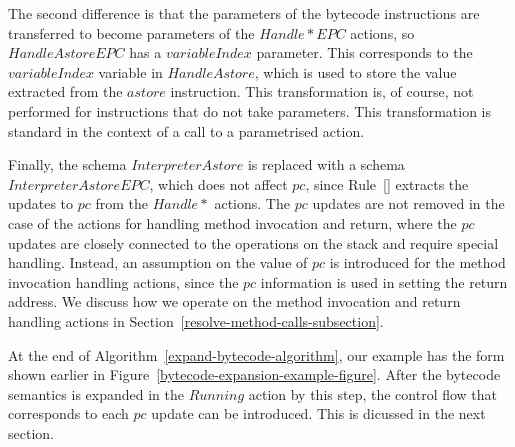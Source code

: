 The second difference is that the parameters of the bytecode
instructions are transferred to become parameters of the
$Handle{*}EPC$ actions, so $HandleAstoreEPC$ has a $variableIndex$
parameter.
This corresponds to the $variableIndex$ variable in $HandleAstore$,
which is used to store the value extracted from the $astore$
instruction.
This transformation is, of course, not performed for instructions that
do not take parameters.
This transformation is standard in the context of a call to a
parametrised action.

Finally, the schema $InterpreterAstore$ is replaced with a schema
$InterpreterAstoreEPC$, which does not affect $pc$, since
Rule~[] extracts the
updates to $pc$ from the $Handle{*}$ actions.
The $pc$ updates are not removed in the case of the actions for
handling method invocation and return, where the $pc$ updates are
closely connected to the operations on the stack and require special
handling.
Instead, an assumption on the value of $pc$ is introduced for the
method invocation handling actions, since the $pc$ information is used
in setting the return address.
We discuss how we operate on the method invocation and return handling
actions in Section~\ref{resolve-method-calls-subsection}.

At the end of Algorithm~\ref{expand-bytecode-algorithm}, our example
has the form shown earlier in
Figure~\ref{bytecode-expansion-example-figure}.
After the bytecode semantics is expanded in the $Running$ action by
this step, the control flow that corresponds to each $pc$ update can
be introduced.
This is dicussed in the next section.